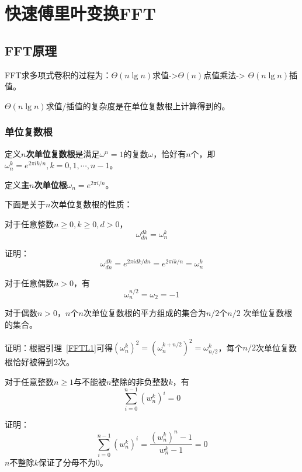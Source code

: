 \section{快速傅里叶变换FFT}
\subsection{FFT原理}
FFT求多项式卷积的过程为：$\Theta(n\lg n)$求值->$\Theta(n)$点值乘法->
$\Theta(n\lg n)$插值。

$\Theta(n\lg n)$求值/插值的复杂度是在单位复数根上计算得到的。

\subsubsection{单位复数根}

定义{\bfseries $n$次单位复数根}是满足$\omega^n=1$的复数$\omega$，恰好有$n$个，即
$\omega_n^k=e^{2\pi ik/n},k=0,1,\cdots,n-1$。

定义{\bfseries 主$n$次单位根}$\omega_n=e^{2\pi i/n}$。

下面是关于$n$次单位复数根的性质：

\begin{lemma}[消去引理]\label{FFTL1}
	对于任意整数$n\geq 0,k \geq 0,d>0$，
	\begin{displaymath}
		\omega_{dn}^{dk}=\omega_n^k
	\end{displaymath}
\end{lemma}
证明：
\begin{displaymath}
	\omega_{dn}^{dk}=e^{2\pi i dk/dn}=e^{2\pi i k/n}=\omega_n^k
\end{displaymath}

\begin{inference}\label{FFTI2}
	对于任意偶数$n>0$，有
	\begin{displaymath}
		\omega_n^{n/2}=\omega_2=-1
	\end{displaymath}
\end{inference}

\begin{lemma}[折半引理]
	对于偶数$n>0$，$n$个$n$次单位复数根的平方组成的集合为$n/2$个$n/2$
	次单位复数根的集合。
\end{lemma}
证明：根据引理~\ref{FFTL1}可得$(\omega_n^k)^2=(\omega_n^{k+n/2})^2=
	\omega_{n/2}^k$，每个$n/2$次单位复数根恰好被得到2次。

\begin{lemma}[求和引理]\label{FFTL4}
	对于任意整数$n\geq 1$与不能被$n$整除的非负整数$k$，有
	\begin{displaymath}
		\sum_{i=0}^{n-1}{(w_n^k)^i}=0
	\end{displaymath}
\end{lemma}
证明：
\begin{displaymath}
	\sum_{i=0}^{n-1}{(w_n^k)^i}=\frac{(w_n^k)^n-1}{w_n^k-1}=0
\end{displaymath}
$n$不整除$k$保证了分母不为0。

